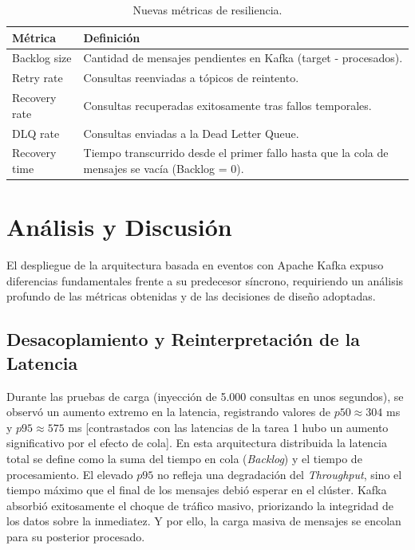 \documentclass[letter,12pt]{article}
\begin{document}
\begin{table}[H]
\centering
\begin{tabular}{lp{10cm}}
\toprule
\textbf{Métrica} & \textbf{Definición} \\
\midrule
Backlog size     & Cantidad de mensajes pendientes en Kafka (target - procesados). \\
Retry rate       & Consultas reenviadas a tópicos de reintento. \\
Recovery rate    & Consultas recuperadas exitosamente tras fallos temporales. \\
DLQ rate         & Consultas enviadas a la Dead Letter Queue. \\
Recovery time    & Tiempo transcurrido desde el primer fallo hasta que la cola de mensajes se vacía (Backlog = 0). \\
\bottomrule
\end{tabular}
\caption{Nuevas métricas de resiliencia.}
\end{table}

\newpage

\section{Análisis y Discusión}

El despliegue de la arquitectura basada en eventos con Apache Kafka expuso diferencias fundamentales frente a su predecesor síncrono, requiriendo un análisis profundo de las métricas obtenidas y de las decisiones de diseño adoptadas.

\subsection{Desacoplamiento y Reinterpretación de la Latencia}
Durante las pruebas de carga (inyección de 5.000 consultas en unos segundos), se observó un aumento extremo en la latencia, registrando valores de $p50 \approx 304$ ms y $p95 \approx 575$ ms [contrastados con las latencias de la tarea 1 hubo un aumento significativo por el efecto de cola]. En esta arquitectura distribuida la latencia total se define como la suma del tiempo en cola (\textit{Backlog}) y el tiempo de procesamiento. El elevado $p95$ no refleja una degradación del \textit{Throughput}, sino el tiempo máximo que el final de los mensajes debió esperar en el clúster. Kafka absorbió exitosamente el choque de tráfico masivo, priorizando la integridad de los datos sobre la inmediatez. Y por ello, la carga masiva de mensajes se encolan para su posterior procesado.
\end{document}
